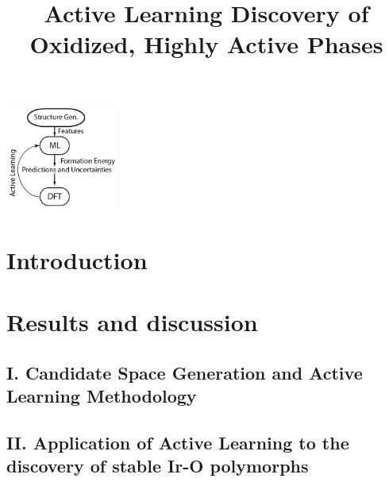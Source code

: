 \documentclass[a6paper,journal=jacsat,manuscript=article]{achemso}  %
\title[ML discovered IrOx phases]{
  Active Learning Discovery of Oxidized, Highly Active \IrOx Phases}
\begin{document}
\begin{tocentry}
\begin{center}
\includegraphics[height=3.5cm]{02_figures/Surrogate_model}
\end{center}
\end{tocentry}


\begin{abstract}

\end{abstract}

\section{Introduction}


\section{Results and discussion}

  \subsection{I. Candidate Space Generation and Active Learning Methodology}
  

  \subsection{II. Application of Active Learning to the discovery of stable Ir-O polymorphs}
  
\end{document}
